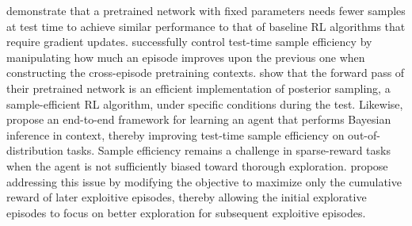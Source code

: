 \documentclass{article}
\begin{document}
\citet{laskinContextReinforcementLearning2022} demonstrate that
a pretrained network with fixed parameters needs fewer samples at test time to achieve similar performance to that of baseline RL algorithms that require gradient updates.
\citet{kirschGeneralPurposeContextLearning2023} successfully control test-time sample efficiency by manipulating how much an episode improves upon the previous one when constructing the cross-episode pretraining contexts.
\citet{leeSupervisedPretrainingCan2023} show that the forward pass of their pretrained network is an efficient implementation of posterior sampling, a sample-efficient RL algorithm, under specific conditions during the test.
Likewise, \citet{xuMetaReinforcementLearningRobust2024} propose an end-to-end framework for learning an agent that performs Bayesian inference in context, thereby improving test-time sample efficiency on out-of-distribution tasks.
Sample efficiency remains a challenge in sparse-reward tasks when the agent is not sufficiently biased toward thorough exploration. \citet{stadieConsiderationsLearningExplore2019a,normanFirstExploreThenExploit2024} propose addressing this issue by modifying the objective to maximize only the cumulative reward of later exploitive episodes,
thereby allowing the initial explorative episodes to focus on better exploration for subsequent exploitive episodes.
\end{document}
